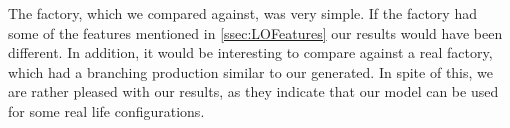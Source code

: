 The factory, which we compared against, was very simple. If the factory had some of the features mentioned in \cref{ssec:LOFeatures} our results would have been different. In addition, it would be interesting to compare against a real factory, which had a branching production similar to our generated. In spite of this, we are rather pleased with our results, as they indicate that our model can be used for some real life configurations.

